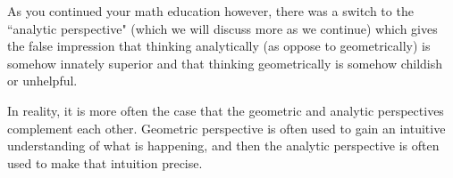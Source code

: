 \documentclass{ximeraXloud}
\begin{document}
    As you continued your math education however, there was a switch to the ``analytic perspective" (which we will discuss more as we continue) which gives the false impression that thinking analytically (as oppose to geometrically) is somehow innately superior and that thinking geometrically is somehow childish or unhelpful.
    
    In reality, it is more often the case that the geometric and analytic perspectives complement each other. Geometric perspective is often used to gain an intuitive understanding of what is happening, and then the analytic perspective is often used to make that intuition precise.
\end{document}
